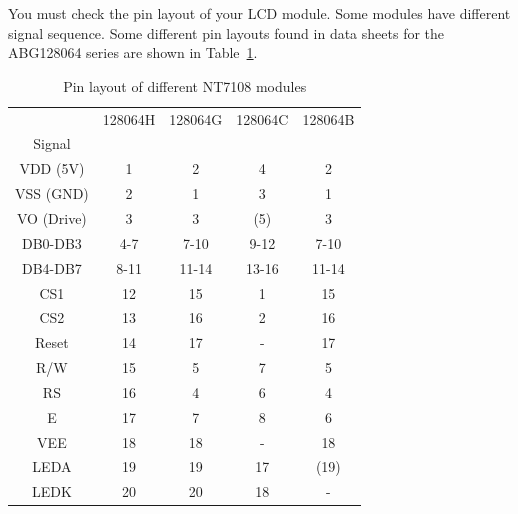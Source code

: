 You must check the pin layout of your LCD module.
Some modules have different signal sequence.
Some different pin layouts found in data sheets for the ABG128064 series are shown in Table~\ref{tab:NT7108types}.

\begin{table}[H]
  \begin{center}
    \begin{tabular}{| c || c | c | c | c |}
    \hline
           & 128064H  &  128064G  & 128064C  & 128064B \\
    Signal &         &          &         &         \\
    \hline
    \hline
  VDD (5V) &   1     &  2       &   4     & 2       \\
    \hline
  VSS (GND) &   2     &  1       &   3     & 1       \\
    \hline
 VO (Drive) &   3     &  3       &  (5)    & 3       \\
    \hline
  DB0-DB3   &   4-7   &  7-10    &   9-12  & 7-10    \\
    \hline
  DB4-DB7   &   8-11  &  11-14   &   13-16 & 11-14   \\
    \hline
  CS1       &   12    &  15      &   1     & 15      \\
  CS2       &   13    &  16      &   2     & 16      \\
    \hline
  Reset     &   14    &  17      &   -     & 17      \\
    \hline
  R/W       &   15    &  5       &   7     & 5       \\
    \hline
  RS        &   16    &  4       &   6     & 4       \\
    \hline
  E         &   17    &  7       &   8     & 6       \\
    \hline
  VEE       &   18    &  18      &   -     & 18      \\
    \hline
  LEDA      &   19    &  19      &   17    & (19)      \\
  LEDK      &   20    &  20      &   18    & -      \\
    \hline
    \end{tabular}
  \end{center}
  \caption{Pin layout of different NT7108 modules}
  \label{tab:NT7108types}
\end{table}

